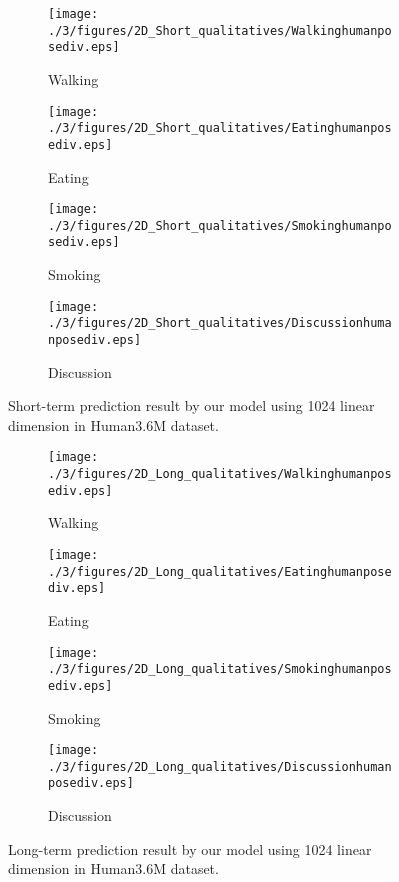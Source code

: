 \begin{figure}
     \centering
     \begin{subfigure}{\textwidth}
         \centering
         \texttt{[image: ./3/figures/2D\_Short\_qualitatives/Walkinghumanposediv.eps]}
         \caption{Walking}
         \label{fig:2d_short_walking}
     \end{subfigure}
     \begin{subfigure}{\textwidth}
         \centering
         \texttt{[image: ./3/figures/2D\_Short\_qualitatives/Eatinghumanposediv.eps]}
         \caption{Eating}
         \label{fig:2d_short_eating}
     \end{subfigure}
     \begin{subfigure}{\textwidth}
         \centering
         \texttt{[image: ./3/figures/2D\_Short\_qualitatives/Smokinghumanposediv.eps]}
         \caption{Smoking}
         \label{fig:2D_short_smoking}
     \end{subfigure}
     \begin{subfigure}{\textwidth}
         \centering
         \texttt{[image: ./3/figures/2D\_Short\_qualitatives/Discussionhumanposediv.eps]}
         \caption{Discussion}
         \label{fig:2D_short_Discussion}
     \end{subfigure}
     \caption{Short-term prediction result by our model using 1024 linear dimension in Human3.6M dataset.}
     \label{fig:2D_short_qual}
\end{figure}

\begin{figure}
     \centering
     \begin{subfigure}{\textwidth}
         \centering
         \texttt{[image: ./3/figures/2D\_Long\_qualitatives/Walkinghumanposediv.eps]}
         \caption{Walking}
         \label{fig:2d_long_walking}
     \end{subfigure}
     \begin{subfigure}{\textwidth}
         \centering
         \texttt{[image: ./3/figures/2D\_Long\_qualitatives/Eatinghumanposediv.eps]}
         \caption{Eating}
         \label{fig:2d_long_eating}
     \end{subfigure}
     \begin{subfigure}{\textwidth}
         \centering
         \texttt{[image: ./3/figures/2D\_Long\_qualitatives/Smokinghumanposediv.eps]}
         \caption{Smoking}
         \label{fig:2D_long_smoking}
     \end{subfigure}
     \begin{subfigure}{\textwidth}
         \centering
         \texttt{[image: ./3/figures/2D\_Long\_qualitatives/Discussionhumanposediv.eps]}
         \caption{Discussion}
         \label{fig:2D_long_Discussion}
     \end{subfigure}
     \caption{Long-term prediction result by our model using 1024 linear dimension in Human3.6M dataset.}
     \label{fig:2D_long_qual}
\end{figure}

